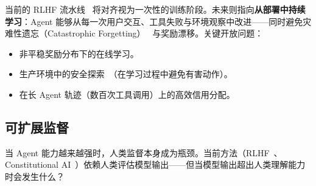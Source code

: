 当前的 RLHF 流水线~\cite{ouyang2022training} 将对齐视为一次性的训练阶段。未来则指向\textbf{从部署中持续学习}：Agent 能够从每一次用户交互、工具失败与环境观察中改进——同时避免灾难性遗忘（Catastrophic Forgetting）~\cite{kirkpatrick2017overcoming} 与奖励漂移。关键开放问题：

\begin{itemize}
  \item 非平稳奖励分布下的在线学习。
  \item 生产环境中的安全探索~\cite{garcia2015comprehensive}（在学习过程中避免有害动作）。
  \item 在长 Agent 轨迹（数百次工具调用）上的高效信用分配。
\end{itemize}

\subsection{可扩展监督}
\label{scalable-oversight}

当 Agent 能力越来越强时，人类监督本身成为瓶颈。当前方法（RLHF~\cite{ouyang2022training}、Constitutional AI~\cite{bai2022constitutional}）依赖人类评估模型输出——但当模型输出超出人类理解能力时会发生什么？

